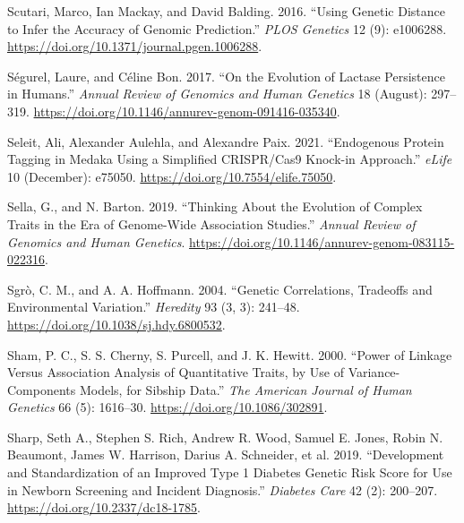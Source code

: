 \documentclass[
]{book}
\newlength{\cslhangindent}
\newlength{\cslentryspacingunit} %
\newenvironment{CSLReferences}[2] %
 {%
  \setlength{\parindent}{0pt}
  \ifodd #1
  \let\oldpar\par
  \def\par{\hangindent=\cslhangindent\oldpar}
  \fi
  \setlength{\parskip}{#2\cslentryspacingunit}
 }%
 {}
\begin{document}
\begin{CSLReferences}{1}{0}
\leavevmode{}%
Scutari, Marco, Ian Mackay, and David Balding. 2016. {``Using {Genetic Distance} to {Infer} the {Accuracy} of {Genomic Prediction}.''} \emph{PLOS Genetics} 12 (9): e1006288. \url{https://doi.org/10.1371/journal.pgen.1006288}.

\leavevmode{}%
Ségurel, Laure, and Céline Bon. 2017. {``On the {Evolution} of {Lactase Persistence} in {Humans}.''} \emph{Annual Review of Genomics and Human Genetics} 18 (August): 297--319. \url{https://doi.org/10.1146/annurev-genom-091416-035340}.

\leavevmode{}%
Seleit, Ali, Alexander Aulehla, and Alexandre Paix. 2021. {``Endogenous Protein Tagging in Medaka Using a Simplified {CRISPR}/{Cas9} Knock-in Approach.''} \emph{eLife} 10 (December): e75050. \url{https://doi.org/10.7554/elife.75050}.

\leavevmode{}%
Sella, G., and N. Barton. 2019. {``Thinking {About} the {Evolution} of {Complex Traits} in the {Era} of {Genome-Wide Association Studies}.''} \emph{Annual Review of Genomics and Human Genetics}. \url{https://doi.org/10.1146/annurev-genom-083115-022316}.

\leavevmode{}%
Sgrò, C. M., and A. A. Hoffmann. 2004. {``Genetic Correlations, Tradeoffs and Environmental Variation.''} \emph{Heredity} 93 (3, 3): 241--48. \url{https://doi.org/10.1038/sj.hdy.6800532}.

\leavevmode{}%
Sham, P. C., S. S. Cherny, S. Purcell, and J. K. Hewitt. 2000. {``Power of {Linkage} Versus {Association Analysis} of {Quantitative Traits}, by {Use} of {Variance-Components Models}, for {Sibship Data}.''} \emph{The American Journal of Human Genetics} 66 (5): 1616--30. \url{https://doi.org/10.1086/302891}.

\leavevmode{}%
Sharp, Seth A., Stephen S. Rich, Andrew R. Wood, Samuel E. Jones, Robin N. Beaumont, James W. Harrison, Darius A. Schneider, et al. 2019. {``Development and {Standardization} of an {Improved Type} 1 {Diabetes Genetic Risk Score} for {Use} in {Newborn Screening} and {Incident Diagnosis}.''} \emph{Diabetes Care} 42 (2): 200--207. \url{https://doi.org/10.2337/dc18-1785}.


\end{CSLReferences}
\end{document}
